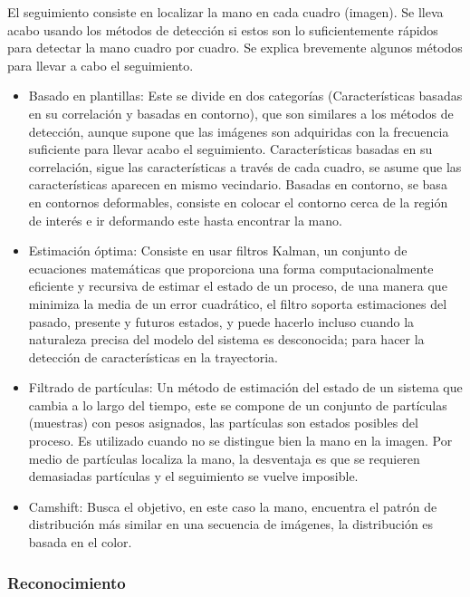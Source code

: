 El seguimiento consiste en localizar la mano en cada cuadro (imagen). Se lleva acabo usando los métodos de detección si estos son lo suficientemente rápidos para detectar la mano cuadro por cuadro. Se explica brevemente algunos  métodos para llevar a cabo el seguimiento. 
\begin{itemize}
	\item Basado en plantillas: Este se divide en dos categorías (Características basadas en su correlación y basadas en contorno), que son similares a los métodos de detección, aunque supone que las imágenes son adquiridas con la frecuencia suficiente para llevar acabo el seguimiento. Características basadas en su correlación, sigue las características a través de cada cuadro, se asume que las características aparecen en mismo vecindario. Basadas en contorno, se basa en contornos deformables, consiste en colocar el contorno cerca de la región de interés e ir deformando este hasta encontrar la mano. 
	\item Estimación óptima: Consiste en usar filtros Kalman, un conjunto de ecuaciones matemáticas que proporciona una forma  computacionalmente eficiente y recursiva de estimar el estado de un proceso, de una manera que minimiza la media de un error cuadrático, el filtro soporta estimaciones del pasado, presente y futuros estados, y puede hacerlo incluso cuando la naturaleza precisa del modelo del sistema es desconocida;  para hacer la detección de características en la trayectoria. 
	\item Filtrado de partículas: Un método de estimación del estado de un sistema que cambia a lo largo del tiempo, este se compone de un conjunto de partículas (muestras) con pesos asignados, las partículas son estados posibles del proceso. Es utilizado cuando no se distingue bien la mano en la imagen. Por medio de partículas localiza la mano, la desventaja es que se requieren demasiadas partículas y  el seguimiento se vuelve imposible. 
	\item Camshift: Busca el objetivo, en este caso la mano, encuentra el patrón de distribución más similar en una secuencia de imágenes, la distribución es basada en el color. 
\end{itemize}

\subsubsection{Reconocimiento}\label{sssec:EtapaReconocimiento}

